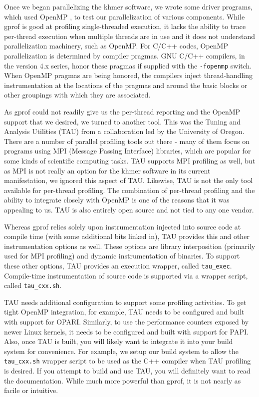 \documentclass{article}
\begin{document}
Once we began parallelizing the khmer software, we wrote some driver programs,
which used OpenMP \cite{web:OpenMP}, to test our parallelization of various
components. While gprof is good at profiling single-threaded execution, it
lacks the ability to trace per-thread execution when multiple threads are in
use and it does not understand parallelization machinery, such as OpenMP. For
C/C++ codes, OpenMP parallelization is determined by compiler pragmas. GNU
C/C++ compilers, in the version 4.x series, honor these pragmas if supplied
with the \texttt{-fopenmp} switch. When OpenMP pragmas are being honored, the
compilers inject thread-handling instrumentation at the locations of the
pragmas and around the basic blocks or other groupings with which they are
associated.

As gprof could not readily give us the per-thread reporting and the OpenMP
support that we desired, we turned to another tool. This was the Tuning and
Analysis Utilities (TAU) \cite{web:TAU} from a collaboration led by the
University of Oregon. There are a number of parallel profiling tools out there
- many of them focus on programs using MPI (Message Passing Interface)
libraries, which are popular for some kinds of scientific computing tasks. TAU
supports MPI profiling as well, but as MPI is not really an option for the
khmer software in its current manifestation, we ignored this aspect of TAU.
Likewise, TAU is not the only tool available for per-thread profiling. The
combination of per-thread profiling and the ability to integrate closely with
OpenMP is one of the reasons that it was appealing to us. TAU is also entirely
open source and not tied to any one vendor.

Whereas gprof relies solely upon instrumentation injected into source code at
compile time (with some additional bits linked in), TAU provides this and other
instrumentation options as well. These options are library interposition
(primarily used for MPI profiling) and dynamic instrumentation of binaries. To
support these other options, TAU provides an execution wrapper, called
\texttt{tau\_exec}. Compile-time instrumentation of source code is supported
via a wrapper script, called \texttt{tau\_cxx.sh}.

TAU needs additional configuration to support some profiling activities.
To get tight OpenMP integration, for example, TAU needs to be
configured and built with support for OPARI. Similarly, to use the
performance counters exposed by newer Linux kernels, it needs to be
configured and built with support for PAPI. Also, once TAU is built,
you will likely want to integrate it into your build system for
convenience. For example, we setup our build system to allow the
\texttt{tau\_cxx.sh} wrapper script to be used as the C++ compiler
when TAU profiling is desired. If you attempt to build and use TAU,
you will definitely want to read the documentation. While much more
powerful than gprof, it is not nearly as facile or intuitive.
\end{document}
